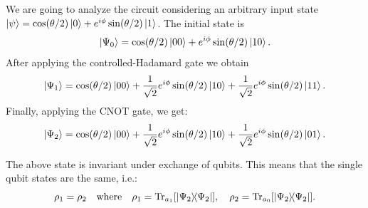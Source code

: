 We are going to analyze the circuit considering an arbitrary input state $\ket{\psi}=\cos(\theta/2)\ket{0}+e^{i\phi}\sin(\theta/2)\ket{1}$.
The initial state is
\[
    \ket{\Psi_0}=\cos(\theta/2)\ket{00}+e^{i\phi}\sin(\theta/2)\ket{10}.
\]
After applying the controlled-Hadamard gate we obtain
\[
    \ket{\Psi_1}=\cos(\theta/2)\ket{00}+\frac{1}{\sqrt{2}}e^{i\phi}\sin(\theta/2)\ket{10}+\frac{1}{\sqrt{2}}e^{i\phi}\sin(\theta/2)\ket{11}.
\]
Finally, applying the CNOT gate, we get:
\[
    \ket{\Psi_2}=\cos(\theta/2)\ket{00}+\frac{1}{\sqrt{2}}e^{i\phi}\sin(\theta/2)\ket{10}+\frac{1}{\sqrt{2}}e^{i\phi}\sin(\theta/2)\ket{01}.
\]

The above state is invariant under exchange of qubits. This means that the single qubit states are the same, i.e.:
\[
    \rho_{1}=\rho_{2} \quad \text{where} \quad \rho_{1}=\Tr_{a_1}[\ketbra{\Psi_2}], \quad \rho_{2}=\Tr_{a_0}[\ketbra{\Psi_2}].
\]

